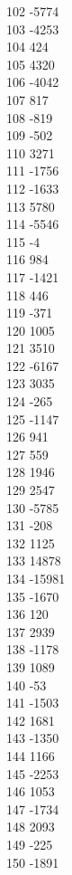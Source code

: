 { 102	-5774 \\
 103	-4253 \\
 104	424 \\
 105	4320 \\
 106	-4042 \\
 107	817 \\
 108	-819 \\
 109	-502 \\
 110	3271 \\
 111	-1756 \\
 112	-1633 \\
 113	5780 \\
 114	-5546 \\
 115	-4 \\
 116	984 \\
 117	-1421 \\
 118	446 \\
 119	-371 \\
 120	1005 \\
 121	3510 \\
 122	-6167 \\
 123	3035 \\
 124	-265 \\
 125	-1147 \\
 126	941 \\
 127	559 \\
 128	1946 \\
 129	2547 \\
 130	-5785 \\
 131	-208 \\
 132	1125 \\
 133	14878 \\
 134	-15981 \\
 135	-1670 \\
 136	120 \\
 137	2939 \\
 138	-1178 \\
 139	1089 \\
 140	-53 \\
 141	-1503 \\
 142	1681 \\
 143	-1350 \\
 144	1166 \\
 145	-2253 \\
 146	1053 \\
 147	-1734 \\
 148	2093 \\
 149	-225 \\
 150	-1891 \\
}
